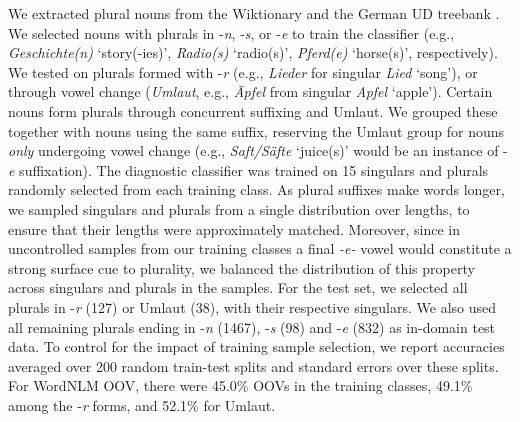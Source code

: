 We extracted plural nouns from the Wiktionary and the German UD
treebank \cite{mcdonald2013universal,brants2002tiger}.  We
selected %
nouns with plurals in -\emph{n}, -\emph{s}, or -\emph{e} to train the
classifier (e.g., \emph{Geschichte(n)} `story(-ies)', \emph{Radio(s)}
`radio(s)', \emph{Pferd(e)} `horse(s)', respectively). We tested on
plurals formed with -\emph{r} (e.g., \emph{Lieder} for singular
\emph{Lied} `song'), or through vowel change (\emph{Umlaut}, e.g.,
\emph{{\"A}pfel} from singular \emph{Apfel} `apple'). Certain nouns
form plurals through concurrent suffixing and Umlaut. We grouped
these together with nouns using the same suffix, reserving the Umlaut
group for nouns \emph{only} undergoing vowel change (e.g.,
\emph{Saft/S\"afte} `juice(s)' would be an instance of -\emph{e}
suffixation). The diagnostic classifier was trained on 15 singulars and plurals
randomly selected from each training class.  As plural suffixes make
words longer, we sampled singulars and
plurals %
from a single distribution over lengths, to ensure that their lengths
were approximately matched. Moreover, since in uncontrolled samples
from our training classes a final \emph{-e-} vowel would constitute a
strong surface cue to plurality, we balanced the distribution of this
property across singulars and plurals in the samples. For the test
set, we selected all plurals in -\emph{r} (127) or Umlaut (38), with
their respective singulars. %
We also used all remaining plurals ending in -\emph{n} (1467),
-\emph{s} (98) and -\emph{e} (832) as in-domain test data.
To control for the impact of training sample selection, we report
accuracies averaged over 200 random train-test splits and
standard errors over these splits. %
For WordNLM OOV, there were 45.0\% OOVs in the training classes,
49.1\% among the -\emph{r} forms, and 52.1\% for Umlaut.

